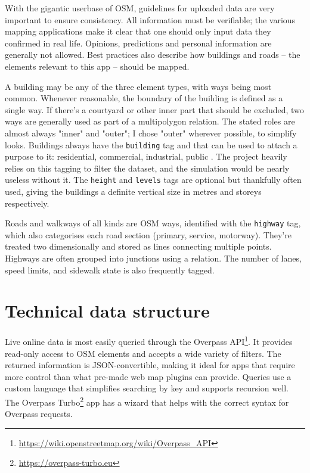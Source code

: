 With the gigantic userbase of OSM, guidelines for uploaded data are very important to ensure consistency. All information must be verifiable; the various mapping applications make it clear that one should only input data they confirmed in real life. Opinions, predictions and personal information are generally not allowed. Best practices also describe how buildings and roads -- the elements relevant to this app -- should be mapped.\cite{osmGoodPractices}

A building may be any of the three element types, with ways being most common. Whenever reasonable, the boundary of the building is defined as a single way. If there's a courtyard or other inner part that should be excluded, two ways are generally used as part of a multipolygon relation. The stated roles are almost always "inner" and "outer"; I chose "outer" wherever possible, to simplify looks. Buildings always have the \verb|building| tag and that can be used to attach a purpose to it: residential, commercial, industrial, public \etc. The project heavily relies on this tagging to filter the dataset, and the simulation would be nearly useless without it. The \verb|height| and \verb|levels| tags are optional but thankfully often used, giving the buildings a definite vertical size in metres and storeys respectively.

Roads and walkways of all kinds are OSM ways, identified with the \verb|highway| tag, which also categorises each road section (\eg primary, service, motorway). They're treated two dimensionally and stored as lines connecting multiple points. Highways are often grouped into junctions using a relation. The number of lanes, speed limits, and sidewalk state is also frequently tagged.


\section{Technical data structure}

Live online data is most easily queried through the Overpass API\footnote{\url{https://wiki.openstreetmap.org/wiki/Overpass_API}}. It provides read-only access to OSM elements and accepts a wide variety of filters. The returned information is JSON-convertible, making it ideal for apps that require more control than what pre-made web map plugins can provide. Queries use a custom language that simplifies searching by key and supports recursion well. The Overpass Turbo\footnote{\url{https://overpass-turbo.eu}} app has a wizard that helps with the correct syntax for Overpass requests.

